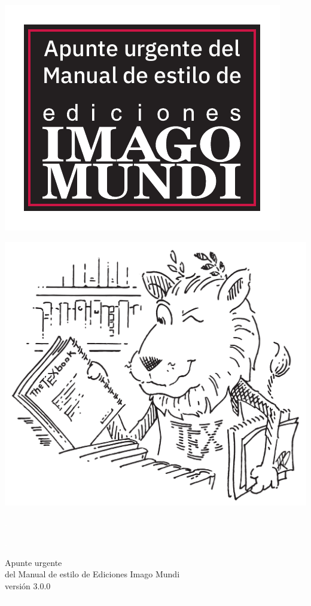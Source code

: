 \documentclass{book}
\begin{document}
\frontmatter

\newpage
\thispagestyle{empty}

\begin{center}
\includegraphics[width=.5\textwidth]{logo-estilo.pdf}

\vfill

\includegraphics[width=\textwidth]{logo-lion.pdf}
\end{center}

\newpage
\thispagestyle{empty}
{\textcolor{white}{.}}\\


\newpage
\thispagestyle{empty}
\begin{center}
{\textcolor{white}{.}}
\vfill

\Large{Apunte urgente\\ del Manual de estilo de Ediciones Imago Mundi}\\
\vspace{12pt}
\large{versión 3.0.0}\\

\vfill
{\textcolor{white}{.}}
\end{center}
\end{document}
